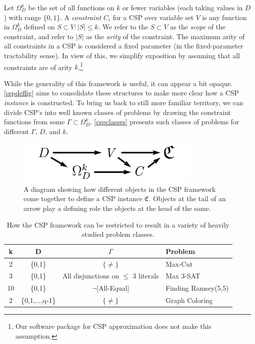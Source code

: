 \documentclass[12pt]{article} %
\begin{document}
Let $\Omega_D^k$ be the set of all functions on $k$ or fewer variables (each taking values in $D$) with range $\{ 0,1 \}$. A \textit{constraint} $C_i$ for a CSP over variable set $V$ is any function in $\Omega_D^k$ defined on $S \subset V : |S| \leq k$. We refer to the $S \subset V$ as the \textit{scope} of the constraint, and refer to $|S|$ as the \textit{arity} of the constraint. The maximum arity of all constraints in a CSP is considered a fixed parameter (in the fixed-parameter tractability sense). In view of this, we simplify exposition by assuming that all constraints are of arity $k$.\footnote{Our software package for CSP approximation does not make this assumption.}

While the generality of this framework is useful, it can appear a bit opaque. \autoref{cspdeffig} aims to consolidate these structures to make more clear how a CSP \textit{instance} is constructed. To bring us back to still more familiar territory, we can divide CSP's into well known classes of problems by drawing the constraint functions from some $\Gamma \subset \Omega_D^k$. \autoref{cspclasses} presents such classes of problems for different $\Gamma$, $D$, and $k$.

\begin{figure}[htb]
\begin{center}
\includegraphics[width=0.8\textwidth]{images/cspdefsec_thinner}
\caption{A diagram showing how different objects in the CSP framework come together to define a CSP instance $\mathfrak{C}$. Objects at the tail of an arrow play a defining role the objects at the head of the same.}
\label{cspdeffig}
\end{center}
\end{figure}

\begin{table}[htb]
\begin{center}
\begin{tabular}{c c c l}
\hline
k & D & $\Gamma$ & Problem \\
\hline
2  & \{0,1\} & $\{\neq\}$ & Max-Cut \\
3  & \{0,1\} & All disjunctions on $\leq $ 3 literals & Max 3-SAT \\
10 & \{0,1\} & $\neg$[All-Equal] & Finding Ramsey(5,5) \\
2  & \{0,1,...,q-1\} & $\{\neq\}$ & Graph Coloring \\
\hline
\end{tabular}
\caption{How the CSP framework can be restricted to result in a variety of heavily studied problem classes.}
\label{cspclasses}
\end{center}
\end{table}
\end{document}
